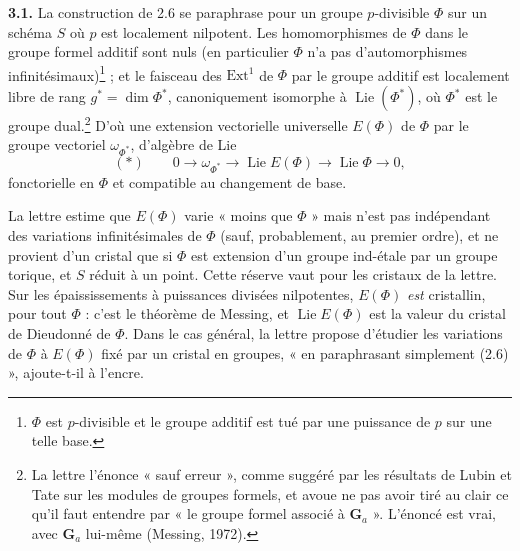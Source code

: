 \documentclass[11pt,a4paper]{article}
\begin{document}
\textbf{3.1.} La construction de 2.6 se paraphrase pour un groupe
$p$-divisible $\Phi$ sur un schéma $S$ où $p$ est localement nilpotent. Les
homomorphismes de $\Phi$ dans le groupe formel additif sont nuls (en
particulier $\Phi$ n'a pas d'automorphismes infinitésimaux)\footnote{$\Phi$
est $p$-divisible et le groupe additif est tué par une puissance de $p$ sur
une telle base.} ; et le faisceau des $\mathrm{Ext}^1$ de $\Phi$ par le groupe
additif est localement libre de rang $g^* = \dim\Phi^*$, canoniquement
isomorphe à $\operatorname{Lie}(\Phi^*)$, où $\Phi^*$ est le groupe dual.\footnote{La
lettre l'énonce « sauf erreur », comme suggéré par les résultats de Lubin et
Tate sur les modules de groupes formels, et avoue ne pas avoir tiré au clair
ce qu'il faut entendre par « le groupe formel associé à $\mathbf{G}_a$ ».
L'énoncé est vrai, avec $\mathbf{G}_a$ lui-même (Messing, 1972).} D'où une
extension vectorielle universelle $E(\Phi)$ de $\Phi$ par le groupe vectoriel
$\omega_{\Phi^*}$, d'algèbre de Lie
\[
  (*) \qquad 0 \longrightarrow \omega_{\Phi^*} \longrightarrow
  \operatorname{Lie}E(\Phi) \longrightarrow \operatorname{Lie}\Phi
  \longrightarrow 0 ,
\]
fonctorielle en $\Phi$ et compatible au changement de base.

La lettre estime que $E(\Phi)$ varie « moins que $\Phi$ » mais n'est pas
indépendant des variations infinitésimales de $\Phi$ (sauf, probablement, au
premier ordre), et ne provient d'un cristal que si $\Phi$ est extension d'un
groupe ind-étale par un groupe torique, et $S$ réduit à un point. Cette
réserve vaut pour les cristaux de la lettre. Sur les épaississements à
puissances divisées nilpotentes, $E(\Phi)$ \emph{est} cristallin, pour tout
$\Phi$ : c'est le théorème de Messing, et $\operatorname{Lie}E(\Phi)$ est la
valeur du cristal de Dieudonné de $\Phi$. Dans le cas général, la lettre
propose d'étudier les variations de $\Phi$ à $E(\Phi)$ fixé par un cristal en
groupes, « en paraphrasant simplement (2.6) », ajoute-t-il à l'encre.
\end{document}
